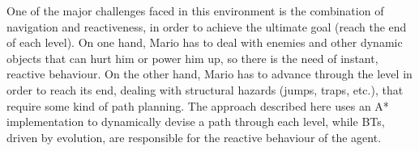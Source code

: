 \documentclass[conference]{IEEEtran}
\begin{document}
%
%
%

One of the major challenges faced in this environment is the
combination of navigation and reactiveness, in order to achieve the ultimate
goal (reach the end of each level). On one hand, Mario has to deal with
enemies and other dynamic objects that can hurt him or power him up, so there
is the need of instant, reactive behaviour. On the other hand, Mario has to
advance through the level in order to reach its end, dealing with structural
hazards (jumps, traps, etc.), that require some kind of path planning.
The approach described here uses an A* implementation to dynamically
devise a path through each level, while BTs, driven by evolution, are
responsible for the reactive behaviour of the agent.
\end{document}

